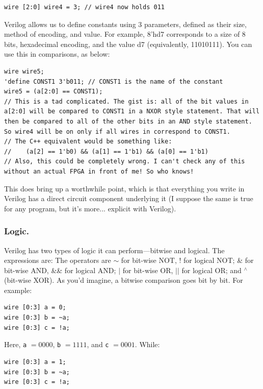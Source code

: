 \bs 
\begin{lstlisting}
wire [2:0] wire4 = 3; // wire4 now holds 011
\end{lstlisting}
\bs

Verilog allows us to define constants using 3 parameters, defined as their size, method of encoding, and value. For example, 8'hd7 corresponds to a size of 8 bits, hexadecimal encoding, and the value d7 (equivalently, 11010111). You can use this in  comparisons, as below: 

\bs 
\begin{lstlisting}
wire wire5; 
'define CONST1 3'b011; // CONST1 is the name of the constant
wire5 = (a[2:0] == CONST1);
// This is a tad complicated. The gist is: all of the bit values in a[2:0] will be compared to CONST1 in a NXOR style statement. That will then be compared to all of the other bits in an AND style statement. So wire4 will be on only if all wires in correspond to CONST1. 
// The C++ equivalent would be something like: 
//    (a[2] == 1'b0) && (a[1] == 1'b1) && (a[0] == 1'b1)
// Also, this could be completely wrong. I can't check any of this without an actual FPGA in front of me! So who knows!
\end{lstlisting}
\bs

This does bring up a worthwhile point, which is that everything you write in Verilog has a direct circuit component underlying it (I suppose the same is true for any program, but it's more... explicit with Verilog). 


\subsubsection{Logic.}

Verilog has two types of logic it can perform---bitwise and logical. The expressions are: The operators are $\sim$ for bit-wise NOT, ! for logical NOT; \& for bit-wise
AND, \&\& for logical AND; $|$ for bit-wise OR, $||$ for logical OR; and ${}^\wedge$ (bit-wise XOR). As you'd imagine, a bitwise comparison goes bit by bit. For example: 

\bs 
\begin{lstlisting}
wire [0:3] a = 0; 
wire [0:3] b = ~a; 
wire [0:3] c = !a; 
\end{lstlisting}
\bs

Here, \texttt{a} $= 0000$, \texttt{b} $= 1111$, and \texttt{c} $= 0001$. While: 


\bs 
\begin{lstlisting}
wire [0:3] a = 1; 
wire [0:3] b = ~a; 
wire [0:3] c = !a; 
\end{lstlisting}
\bs

